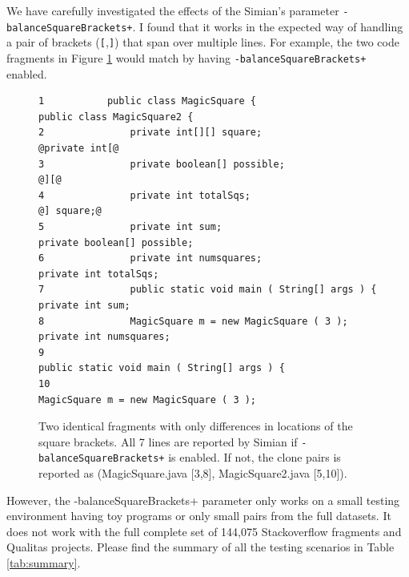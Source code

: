 \documentclass{IEEEtran}
\begin{document}
We have carefully investigated the effects of the Simian's parameter \texttt{-balanceSquareBrackets+}. I found that it works in the expected way of handling a pair of brackets (\texttt{[},\texttt{]}) that span over multiple lines. For example, the two code fragments in Figure \ref{fig:two_frags} would match by having \texttt{-balanceSquareBrackets+} enabled.

\noindent\begin{figure}[H]
	\scriptsize
	\begin{lstlisting}[frame=single,style=base]
1           public class MagicSquare {                             public class MagicSquare2 {
2               private int[][] square;                                @private int[@
3               private boolean[] possible;                                        @][@
4               private int totalSqs;                                              @] square;@
5               private int sum;                                       private boolean[] possible;
6               private int numsquares;                                private int totalSqs;
7               public static void main ( String[] args ) {            private int sum;
8               MagicSquare m = new MagicSquare ( 3 );                 private int numsquares;
9                                                                      public static void main ( String[] args ) {
10                                                                     MagicSquare m = new MagicSquare ( 3 );
	\end{lstlisting}
	\caption{Two identical fragments with only differences in locations of the square brackets. All 7 lines are reported by Simian if \small\texttt{-balanceSquareBrackets+} \normalsize is enabled. If not, the clone pairs is reported as \newline (MagicSquare.java [3,8], MagicSquare2.java [5,10]).} 
	\label{fig:two_frags}
\end{figure}

However, the -balanceSquareBrackets+ parameter only works on a small testing environment having toy programs or only small pairs from the full datasets. It does not work with the full complete set of 144,075 Stackoverflow fragments and Qualitas projects. Please find the summary of all the testing scenarios in Table \ref{tab:summary}. %
\end{document}
